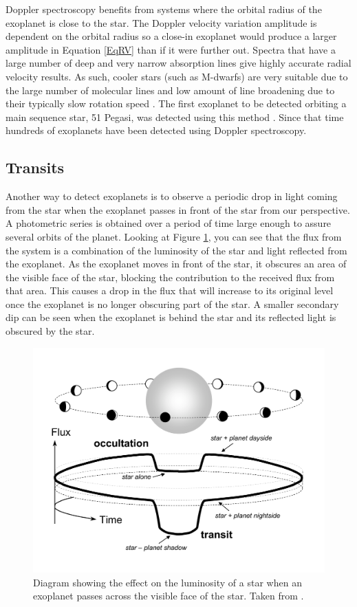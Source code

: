 Doppler spectroscopy benefits from systems where the orbital radius of the exoplanet is close to the star. The Doppler velocity variation amplitude is dependent on the orbital radius so a close-in exoplanet would produce a larger amplitude in Equation \ref{EqRV} than if it were further out. Spectra that have a large number of deep and very narrow absorption lines give highly accurate radial velocity results. As such, cooler stars (such as M-dwarfs) are very suitable due to the large number of molecular lines and low amount of line broadening due to their typically slow rotation speed \citep{2005Reid}. The first exoplanet to be detected orbiting a main sequence star, 51 Pegasi, was detected using this method \citep{1995Mayor}. Since that time hundreds of exoplanets have been detected using Doppler spectroscopy.
\subsection{Transits}
\label{SecTrans}
Another way to detect exoplanets is to observe a periodic drop in light coming from the star when the exoplanet passes in front of the star from our perspective. A photometric series is obtained over a period of time large enough to assure several orbits of the planet. Looking at Figure \ref{FigTransit}, you can see that the flux from the system is a combination of the luminosity of the star and light reflected from the exoplanet. As the exoplanet moves in front of the star, it obscures an area of the visible face of the star, blocking the contribution to the received flux from that area. This causes a drop in the flux that will increase to its original level once the exoplanet is no longer obscuring part of the star. A smaller secondary dip can be seen when the exoplanet is behind the star and its reflected light is obscured by the star.\\
\begin{figure}[hbt]
\centering
\includegraphics[scale=0.4]{circular_diagram.pdf}
\caption{Diagram showing the effect on the luminosity of a star when an exoplanet passes across the visible face of the star. Taken from \citet{2010Winn}.}
\label{FigTransit}
\end{figure}
